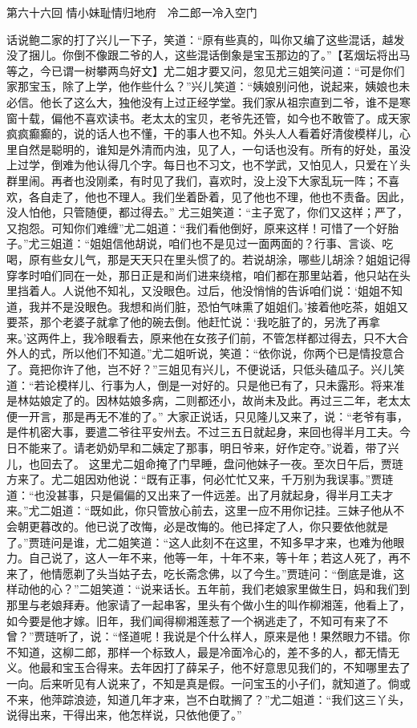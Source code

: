 \documentclass[12pt,oneside]{book}
\begin{document}
 
第六十六回  情小妹耻情归地府　冷二郎一冷入空门


话说鲍二家的打了兴儿一下子，笑道：“原有些真的，叫你又编了这些混话，越发没了捆儿。你倒不像跟二爷的人，这些混话倒象是宝玉那边的了。”【茗烟坛将出马等之，今已谓一树攀两鸟好文】尤二姐才要又问，忽见尤三姐笑问道：“可是你们家那宝玉，除了上学，他作些什么？”兴儿笑道：“姨娘别问他，说起来，姨娘也未必信。他长了这么大，独他没有上过正经学堂。我们家从祖宗直到二爷，谁不是寒窗十载，偏他不喜欢读书。老太太的宝贝，老爷先还管，如今也不敢管了。成天家疯疯癫癫的，说的话人也不懂，干的事人也不知。外头人人看着好清俊模样儿，心里自然是聪明的，谁知是外清而内浊，见了人，一句话也没有。所有的好处，虽没上过学，倒难为他认得几个字。每日也不习文，也不学武，又怕见人，只爱在丫头群里闹。再者也没刚柔，有时见了我们，喜欢时，没上没下大家乱玩一阵；不喜欢，各自走了，他也不理人。我们坐着卧着，见了他也不理，他也不责备。因此，没人怕他，只管随便，都过得去。”
尤三姐笑道：“主子宽了，你们又这样；严了，又抱怨。可知你们难缠”尤二姐道：“我们看他倒好，原来这样！可惜了一个好胎子。”尤三姐道：“姐姐信他胡说，咱们也不是见过一面两面的？行事、言谈、吃喝，原有些女儿气，那是天天只在里头惯了的。若说胡涂，哪些儿胡涂？姐姐记得穿孝时咱们同在一处，那日正是和尚们进来绕棺，咱们都在那里站着，他只站在头里挡着人。人说他不知礼，又没眼色。过后，他没悄悄的告诉咱们说：‘姐姐不知道，我并不是没眼色。我想和尚们脏，恐怕气味熏了姐姐们。’接着他吃茶，姐姐又要茶，那个老婆子就拿了他的碗去倒。他赶忙说：‘我吃脏了的，另洗了再拿来。’这两件上，我冷眼看去，原来他在女孩子们前，不管怎样都过得去，只不大合外人的式，所以他们不知道。”尤二姐听说，笑道：“依你说，你两个已是情投意合了。竟把你许了他，岂不好？”三姐见有兴儿，不便说话，只低头磕瓜子。兴儿笑道：“若论模样儿、行事为人，倒是一对好的。只是他已有了，只未露形。将来准是林姑娘定了的。因林姑娘多病，二则都还小，故尚未及此。再过三二年，老太太便一开言，那是再无不准的了。”
大家正说话，只见隆儿又来了，说：“老爷有事，是件机密大事，要遣二爷往平安州去。不过三五日就起身，来回也得半月工夫。今日不能来了。请老奶奶早和二姨定了那事，明日爷来，好作定夺。”说着，带了兴儿，也回去了。
这里尤二姐命掩了门早睡，盘问他妹子一夜。至次日午后，贾琏方来了。尤二姐因劝他说：“既有正事，何必忙忙又来，千万别为我误事。”贾琏道：“也没甚事，只是偏偏的又出来了一件远差。出了月就起身，得半月工夫才来。”尤二姐道：“既如此，你只管放心前去，这里一应不用你记挂。三妹子他从不会朝更暮改的。他已说了改悔，必是改悔的。他已择定了人，你只要依他就是了。”贾琏问是谁，尤二姐笑道：“这人此刻不在这里，不知多早才来，也难为他眼力。自己说了，这人一年不来，他等一年，十年不来，等十年；若这人死了，再不来了，他情愿剃了头当姑子去，吃长斋念佛，以了今生。”贾琏问：“倒底是谁，这样动他的心？”二姐笑道：“说来话长。五年前，我们老娘家里做生日，妈和我们到那里与老娘拜寿。他家请了一起串客，里头有个做小生的叫作柳湘莲，他看上了，如今要是他才嫁。旧年，我们闻得柳湘莲惹了一个祸逃走了，不知可有来了不曾？”贾琏听了，说：“怪道呢！我说是个什么样人，原来是他！果然眼力不错。你不知道，这柳二郎，那样一个标致人，最是冷面冷心的，差不多的人，都无情无义。他最和宝玉合得来。去年因打了薛呆子，他不好意思见我们的，不知哪里去了一向。后来听见有人说来了，不知是真是假。一问宝玉的小子们，就知道了。倘或不来，他萍踪浪迹，知道几年才来，岂不白耽搁了？”尤二姐道：“我们这三丫头，说得出来，干得出来，他怎样说，只依他便了。”
\end{document}
